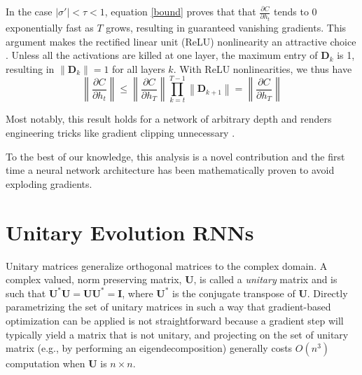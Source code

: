 \documentclass{article} %
\newcommand{\matr}[1]{\mathbf{#1}}
\newcommand\norm[1]{\left\lVert#1\right\rVert}
\begin{document}
In the case $|\sigma'| < \tau < 1$, equation \ref{bound} proves that 
that $\frac{\partial C}{\partial h_t}$ tends to 0 exponentially fast as $T$ grows, 
resulting in guaranteed vanishing gradients. 
This argument makes the rectified linear unit (ReLU) nonlinearity an attractive choice
\citep{Glorot2011, Nair2010}. Unless all the activations are killed at one layer, 
the maximum entry of $\matr{D}_k$ is 1, resulting in
$\norm{\matr{D}_k} = 1$ for all layers $k$. With ReLU nonlinearities, we thus have
\begin{equation}
  \norm{\frac{\partial C}{\partial h_t}} \leq \norm{ \frac{\partial C}{\partial h_T}} 
  \prod_{k=t}^{T-1} \norm{\matr{D}_{k+1}} = \norm{\frac{\partial C}{\partial h_T}}
\label{bound2}
\end{equation}

Most notably, this result holds for a network of arbitrary depth and renders engineering tricks
like gradient clipping unnecessary \citep{Pascanu2013}. 

To the best of our knowledge, this analysis is a novel contribution and the first time a 
neural network architecture has been mathematically proven to avoid exploding gradients. 


%
%
%
%
%

\section{Unitary Evolution RNNs}
\label{sec:uRNN}

Unitary matrices generalize orthogonal matrices to the complex domain.
A complex valued, norm preserving matrix,
$\matr{U}$, is called a \textit{unitary} matrix and is such that 
$\matr{U}^* \matr{U} = \matr{U} \matr{U}^* = \matr{I}$, where $\matr{U}^*$ is the conjugate transpose
of $\matr{U}$.  Directly parametrizing the set of unitary matrices in such a way that gradient-based
optimization can be applied is not straightforward because a gradient step will typically yield
a matrix that is not unitary, and projecting on the set of unitary matrix (e.g., by performing
an eigendecomposition) generally costs $O(n^3)$ computation when $\matr{U}$ is $n \times n$.
\end{document}
